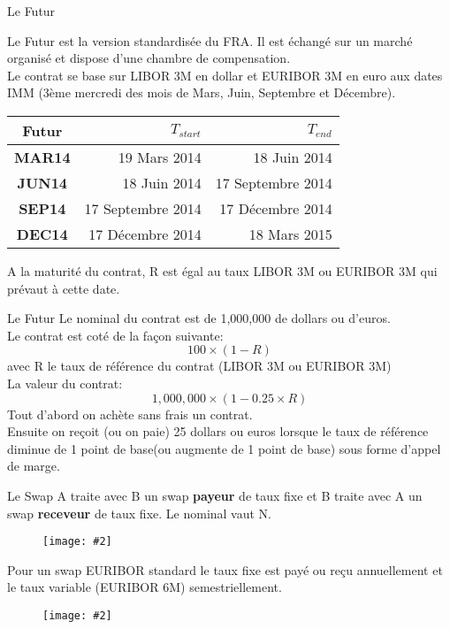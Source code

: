 \documentclass{beamer}
\newcommand{\FIG}[2]{\texttt{[image: \#2]}}
\begin{document}
\begin{frame}{Le Futur}

Le Futur est la version standardisée du FRA. Il est échangé sur un marché organisé et dispose d'une chambre de compensation.\\
Le contrat se base sur LIBOR 3M en dollar et EURIBOR 3M en euro aux dates IMM (3ème mercredi des mois de Mars, Juin, Septembre et Décembre).\\
\begin{center}
\begin{tabular}{|c|r|r|}
  \hline
  \textbf{Futur} & \textbf{$T_{start}$} & \textbf{$T_{end}$} \\
  \hline
  \textbf{MAR14} & 19 Mars 2014 & 18 Juin 2014 \\
  \textbf{JUN14} & 18 Juin 2014 & 17 Septembre 2014 \\
  \textbf{SEP14} & 17 Septembre 2014 & 17 Décembre 2014 \\
  \textbf{DEC14} & 17 Décembre 2014 &  18 Mars 2015 \\
  \hline
\end{tabular}
\end{center}
A la maturité du contrat, R est égal au taux LIBOR 3M ou EURIBOR 3M qui prévaut à cette date.
\end{frame}

\begin{frame}{Le Futur}
Le nominal du contrat est de 1,000,000 de dollars ou d'euros.\\
Le contrat est coté de la façon suivante:
\[
100\times(1 - R)
\] 
avec R le taux de référence du contrat (LIBOR 3M ou EURIBOR 3M)\\
La valeur du contrat:
\[
1,000,000\times(1-0.25\times R)
\]
Tout d'abord on achète sans frais un contrat.\\
Ensuite on reçoit (ou on paie) 25 dollars ou euros lorsque le taux de référence diminue de 1 point de base(ou augmente de 1 point de base) sous forme d'appel de marge.
\end{frame}

\begin{frame}{Le Swap}
A traite avec B un swap \textbf{payeur} de taux fixe et B traite avec A un swap \textbf{receveur} de taux fixe. Le nominal vaut N.
\begin{figure}[h]
\FIG{5cm}{figures/schema_swap_1.jpg}
\end{figure}
Pour un swap EURIBOR standard le taux fixe est payé ou reçu annuellement et le taux variable (EURIBOR 6M) semestriellement.
\begin{figure}[h]
\FIG{7cm}{figures/schema_swap_2.jpg}
\end{figure}
\end{frame}
\end{document}
